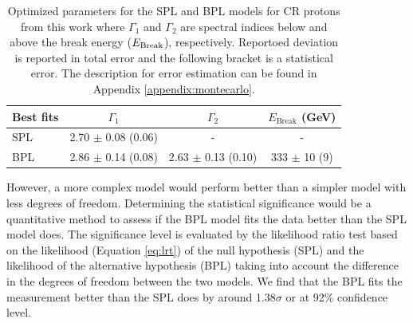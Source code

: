 \begin{table}[h!]
    \centering
    \begin{tabular}{l | c | c | c}
      Best fits & $\Gamma_1$ & $\Gamma_2$ & $E_{\text{Break}}$ (GeV) \\
      \hline \hline
      SPL & 2.70 $\pm$ 0.08 (0.06) & - & -  \\
      BPL & 2.86 $\pm$ 0.14 (0.08) & 2.63 $\pm$ 0.13 (0.10) & 333 $\pm$ 10 (9)
    \end{tabular}
    \caption{
        Optimized parameters for the SPL and BPL models for
        CR protons from this work where $\Gamma_1$ and $\Gamma_2$
        are spectral indices below and above
        the break energy ($E_{\rm Break}$), respectively.        
        Reportoed deviation is reported in total error
        and the following bracket is a statistical error.
        The description for error estimation can be found 
        in Appendix \ref{appendix:montecarlo}.
    }
    \label{tb:bestfit}
\end{table}


However, a more complex model would perform better than
a simpler model with less degrees of freedom.
Determining the statistical significance
would be a quantitative method to assess if the BPL model fits
the data better than the SPL model does.
The significance level is evaluated by the likelihood ratio test
based on the likelihood (Equation \ref{eq:lrt}) of the null hypothesis (SPL)
and the likelihood of the alternative hypothesis (BPL)
taking into account the difference in the degrees of freedom between
the two models. 
We find that the BPL fits the measurement better than the SPL does by
around 1.38$\sigma$ or at 92\% confidence level.



